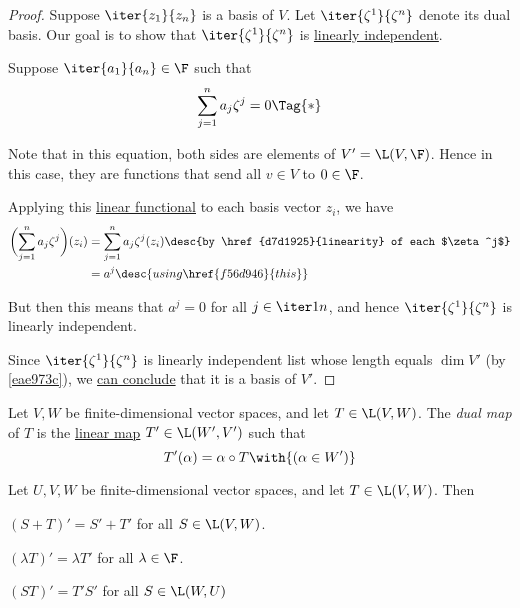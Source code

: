 \begin{proof}
  Suppose $\iter{z_1}{z_n}$ is a basis of $V$. Let $\iter{\zeta^1}{\zeta^n}$
  denote its dual basis. Our goal is to show that $\iter{\zeta^1}{\zeta^n}$ is
  \href{c133a44}{linearly independent}.

  Suppose $\iter{a_1}{a_n}\in\F$ such that
  \begin{equation*}
    \sum_{j=1}^na_j\zeta^j=0\Tag{*}
  \end{equation*}

  Note that in this equation, both sides are elements of $V'=\L(V,\F)$. Hence
  in this case, they are functions that send all $v\in V$ to $0\in\F$.

  Applying this \href{b0b1db8}{linear functional} to each basis vector $z_i$,
  we have
  \begin{align*}
    \biggl(\sum_{j=1}^na_j\zeta^j\biggr)(z_i)
     &=\sum_{j=1}^na_j\zeta^j(z_i)\desc{by \href{d7d1925}{linearity} of each $\zeta^j$} \\
     &= a^j\desc{using \href{f56d946}{this}}
  \end{align*}

  But then this means that $a^j=0$ for all $j\in\iter1n$, and hence
  $\iter{\zeta^1}{\zeta^n}$ is linearly independent.

  Since $\iter{\zeta^1}{\zeta^n}$ is linearly independent list whose length
  equals $\dim V'$ (by \autoref{eae973c}), we \href{e3d5b2a}{can conclude} that
  it is a basis of $V'$.
\end{proof}

\label{d80860c}

Let $V,W$ be finite-dimensional vector spaces, and let $T\in\L(V,W)$. The
\textit{dual map} of $T$ is the \href{d7d1925}{linear map} $T'\in\L(W',V')$
such that
$$
  T'(\alpha)=\alpha\circ T\with{(\alpha\in W')}
$$

\label{bd9eccc}

Let $U,V,W$ be finite-dimensional vector spaces, and let $T\in\L(V,W)$. Then
\begin{enumerata}
  \item $(S+T)'=S'+T'$ for all $S\in\L(V,W)$.
  \item $(\lambda T)'=\lambda T'$ for all $\lambda\in\F$.
  \item $(ST)'=T'S'$ for all $S\in\L(W,U)$
\end{enumerata}

